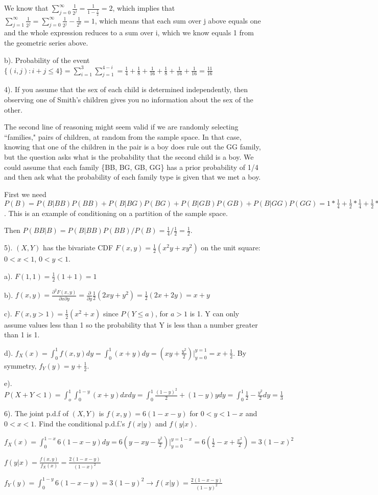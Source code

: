 \documentclass[11pt]{article}
\begin{document}
We know that $\sum_{j=0}^\infty \frac{1}{2^{j}}=\frac{1}{1-\frac{1}{2}}=2$, which implies that $\sum_{j=1}^\infty \frac{1}{2^{j}}=\sum_{j=0}^\infty \frac{1}{2^{j}}-\frac{1}{2^0}=1$, which means that each sum over j above equals one and the whole expression reduces to a sum over i, which we know equals 1 from the geometric series above.

b).  Probability of the event $\{(i,j): i+j\leq 4\}=\sum_{i=1}^3\sum_{j=1}^{4-i}=\frac{1}{4}+\frac{1}{8}+\frac{1}{16}+\frac{1}{8}+\frac{1}{16}+\frac{1}{16}=\frac{11}{16}$
\vspace*{.1in}

4).  If you assume that the sex of each child is determined independently, then observing one of Smith's children gives you no information about the sex of the other.  

The second line of reasoning might seem valid if we are randomly selecting ``families," pairs of children, at random from the sample space.  In that case, knowing that one of the children in the pair is a boy does rule out the GG family, but the question asks what is the probability that the second child is a boy.  We could assume that each family \{BB, BG, GB, GG\} has a prior probability of 1/4 and then ask what the probability of each family type is given that we met a boy.  

First we need $P(B)=P(B|BB)P(BB)+P(B|BG)P(BG)+P(B|GB)P(GB)+P(B|GG)P(GG)=1*\frac{1}{4}+\frac{1}{2}*\frac{1}{4}+\frac{1}{2}*\frac{1}{4}+0*\frac{1}{4}=\frac{1}{2}$.  This is an example of conditioning on a partition of the sample space.

Then $P(BB|B)=P(B|BB)P(BB)/P(B)=\frac{1}{4}/\frac{1}{2}=\frac{1}{2}$.

\vspace*{.1in}

5).  $(X, Y)$ has the bivariate CDF $F(x,y)=\frac{1}{2}(x^2y+xy^2)$ on the unit square:  $0<x<1$, $0<y<1$.

a).  $F(1,1)=\frac{1}{2}(1+1)=1$

b).  $f(x,y)=\frac{\partial ^2F(x,y)}{\partial x\partial y}=\frac{\partial }{\partial y}\frac{1}{2}(2xy+y^2)=\frac{1}{2}(2x+2y)=x+y$

c).  $F(x, y>1)=\frac{1}{2}(x^2+x)$ since $P(Y\leq a)$, for $a>1$ is 1.  Y can only assume values less than 1 so the probability that Y is less than a number greater than 1 is 1.

d).  $f_X(x)=\int_0^1f(x,y)dy=\int_0^1(x+y)dy=(xy+\frac{y^2}{2})\bigg|_{y=0}^{y=1}=x+\frac{1}{2}$.  By symmetry, $f_Y(y)=y+\frac{1}{2}$.

e).  $P(X+Y<1)=\int_o^1\int_0^{1-y}(x+y)dxdy=\int_0^1\frac{(1-y)^2}{2}+(1-y)ydy=\int_0^1\frac{1}{2}-\frac{y^2}{2}dy=\frac{1}{3}$

\vspace*{.1in}
6). The joint p.d.f of $(X,Y)$ is $f(x,y)=6(1-x-y)$ for $0<y<1-x$ and $0<x<1$.  Find the conditional p.d.f.'s $f(x|y)$ and $f(y|x)$.

$f_X(x)=\int_0^{1-x}6(1-x-y)dy=6(y-xy-\frac{y^2}{2})\bigg|_{y=0}^{y=1-x}=6(\frac{1}{2}-x+\frac{x^2}{2})=3(1-x)^2$

$f(y|x)=\frac{f(x,y)}{f_X(x)}=\frac{2(1-x-y)}{(1-x)^2}$

$f_Y(y)=\int_0^{1-y}6(1-x-y)=3(1-y)^2 \rightarrow f(x|y)=\frac{2(1-x-y)}{(1-y)^2}$
\end{document}
